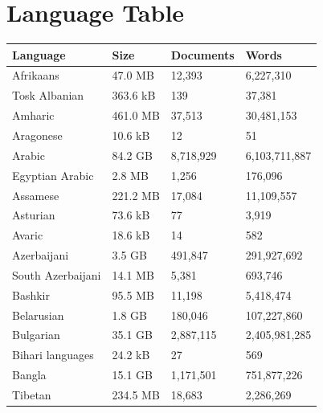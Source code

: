\section{Language Table}

\begin{table}[t!]
    \centering\tiny
    \begin{tabular}{llll}
        \toprule
        Language                    & Size      & Documents   & Words           \\
        \midrule
        Afrikaans                   & 47.0 MB   & 12,393      & 6,227,310       \\
        Tosk Albanian               & 363.6 kB  & 139         & 37,381          \\
        Amharic                     & 461.0 MB  & 37,513      & 30,481,153      \\
        Aragonese                   & 10.6 kB   & 12          & 51              \\
        Arabic                      & 84.2 GB   & 8,718,929   & 6,103,711,887   \\
        Egyptian Arabic             & 2.8 MB    & 1,256       & 176,096         \\
        Assamese                    & 221.2 MB  & 17,084      & 11,109,557      \\
        Asturian                    & 73.6 kB   & 77          & 3,919           \\
        Avaric                      & 18.6 kB   & 14          & 582             \\
        Azerbaijani                 & 3.5 GB    & 491,847     & 291,927,692     \\
        South Azerbaijani           & 14.1 MB   & 5,381       & 693,746         \\
        Bashkir                     & 95.5 MB   & 11,198      & 5,418,474       \\
        Belarusian                  & 1.8 GB    & 180,046     & 107,227,860     \\
        Bulgarian                   & 35.1 GB   & 2,887,115   & 2,405,981,285   \\
        Bihari languages            & 24.2 kB   & 27          & 569             \\
        Bangla                      & 15.1 GB   & 1,171,501   & 751,877,226     \\
        Tibetan                     & 234.5 MB  & 18,683      & 2,286,269       \\

\end{tabular}
\end{table}
